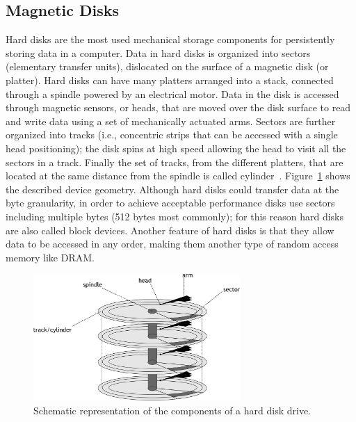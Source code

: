 \subsection{Magnetic Disks}
Hard disks are the most used mechanical storage components for persistently storing data in a computer. Data in hard disks is organized into sectors (elementary transfer units), dislocated on the surface 
of a magnetic disk (or platter). Hard disks can have many platters arranged into a stack, connected through a spindle powered by an electrical motor. Data in the disk is accessed through magnetic sensors, 
or heads, that are moved over the disk surface to read and write data using a set of mechanically actuated arms. Sectors are further organized into tracks (i.e., concentric strips that can be accessed with 
a single head positioning); the disk spins at high speed allowing the head to visit all the sectors in a track. Finally the set of tracks, from the different platters, that are located at the same distance 
from the spindle is called cylinder~\cite{Ruemmler1994}. %
Figure~\ref{figure: hdd} shows the described device geometry. Although hard disks could transfer data at the byte granularity, in order to achieve acceptable performance disks use sectors
including multiple bytes (512 bytes most commonly); for this reason hard disks are also called block devices. Another feature of hard disks is that they allow data to be accessed in any order, making them 
another type of random access memory like DRAM.

\begin{figure}[!htb]
  \centering
  \includegraphics[width=0.7\textwidth]{figures/hdd}
  \caption{Schematic representation of the components of a hard disk drive.}
  \label{figure: hdd}
\end{figure}

